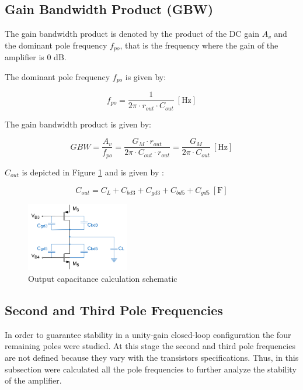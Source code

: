 \subsection{Gain Bandwidth Product (GBW)}
The gain bandwidth product is denoted by the product of the DC gain $A_v$ and the dominant pole frequency $f_{po}$, that is the frequency where the gain of the amplifier is 0 dB. 

The dominant pole frequency $f_{po}$ is given by:

\begin{equation}
    f_{po} = \frac{1}{2\pi \cdot r_{out} \cdot C_{out}} \ [\si{\hertz}]
    \label{eq:fpo}
\end{equation}

The gain bandwidth product is given by:

\begin{equation}
    GBW = \frac{A_v}{f_{po}} = \frac{G_M \cdot r_{out}}{2\pi \cdot C_{out} \cdot r_{out}}=\frac{G_M}{2\pi \cdot C_{out}} \ [\si{\hertz}]
    \label{eq:GBW}
\end{equation}

$C_{out}$ is depicted in Figure \ref{fig:cout_sch} and is given by :

\begin{equation}
    C_{out} = C_L + C_{bd3} + C_{gd3} + C_{bd5} + C_{gd5} \ [\si{\farad}]
    \label{eq:cout}
\end{equation}

\begin{figure}[H]
    \centering
    \includegraphics[width=0.4\textwidth]{Images/Cout_sch.png}
    \caption{Output capacitance calculation schematic}
    \label{fig:cout_sch}
\end{figure}

\subsection{Second and Third Pole Frequencies}
In order to guarantee stability in a unity-gain closed-loop configuration the four remaining poles were studied. At this stage the second and third pole frequencies are not defined because they vary with the transistors specifications. Thus, in this subsection were calculated all the pole frequencies to further analyze the stability of the amplifier. 

